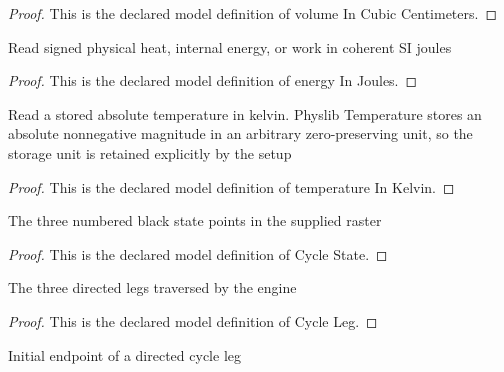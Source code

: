 \begin{proof}
  This is the declared model definition of volume In Cubic Centimeters.
\end{proof}
\begin{definition}
  \label{def:physics:phyx-mini-0430:phyxminiproblems-problemphyxmini0430-energyinjoules}
  Read signed physical heat, internal energy, or work in coherent SI joules
\end{definition}
\begin{proof}
  This is the declared model definition of energy In Joules.
\end{proof}
\begin{definition}
  \label{def:physics:phyx-mini-0430:phyxminiproblems-problemphyxmini0430-temperatureinkelvin}
  Read a stored absolute temperature in kelvin. Physlib Temperature stores an absolute nonnegative magnitude in an arbitrary zero-preserving unit, so the storage unit is retained explicitly by the setup
\end{definition}
\begin{proof}
  This is the declared model definition of temperature In Kelvin.
\end{proof}
\begin{definition}
  \label{def:physics:phyx-mini-0430:phyxminiproblems-problemphyxmini0430-cyclestate}
  The three numbered black state points in the supplied raster
\end{definition}
\begin{proof}
  This is the declared model definition of Cycle State.
\end{proof}
\begin{definition}
  \label{def:physics:phyx-mini-0430:phyxminiproblems-problemphyxmini0430-cycleleg}
  The three directed legs traversed by the engine
\end{definition}
\begin{proof}
  This is the declared model definition of Cycle Leg.
\end{proof}
\begin{definition}
  \label{def:physics:phyx-mini-0430:phyxminiproblems-problemphyxmini0430-legsource}
  Initial endpoint of a directed cycle leg
\end{definition}
